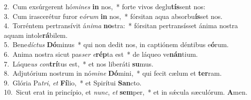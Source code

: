 {2.~}Cum exsúrgerent hó\textit{mi}\textit{nes} \textbf{in} nos,~* forte vivos deglu\textbf{tís}sent nos:\\
{3.~}Cum irascerétur furor e\textit{ó}\textit{rum} \textbf{in} nos,~* fórsitan aqua absorbu\textbf{ís}set nos.\\
{4.~}Torréntem pertransívit á\textit{ni}\textit{ma} \textbf{no}stra:~* fórsitan pertransísset ánima nostra aquam intole\textbf{rá}bilem.\\
{5.~}Bene\textit{dí}\textit{ctus} \textbf{Dó}minus~* qui non dedit nos, in captiónem déntibus e\textbf{ó}rum.\\
{6.~}Anima nostra sicut pas\textit{ser} \textit{e}\textbf{rép}ta est~* de láqueo ve\textbf{nán}tium.\\
{7.~}Láque\textit{us} \textit{con}\textbf{trí}tus est,~* et nos liberáti \textbf{su}mus.\\
{8.~}Adjutórium nostrum in nó\textit{mi}\textit{ne} \textbf{Dó}mini,~* qui fecit cælum et \textbf{ter}ram.\\
{9.~}Glória Pa\textit{tri}, \textit{et} \textbf{Fí}lio,~* et Spirítui \textbf{San}cto.\\
{10.~}Sicut erat in princípio, et \textit{nunc}, \textit{et} \textbf{sem}per,~* et in sǽcula sæculórum. \textbf{A}men.\\
